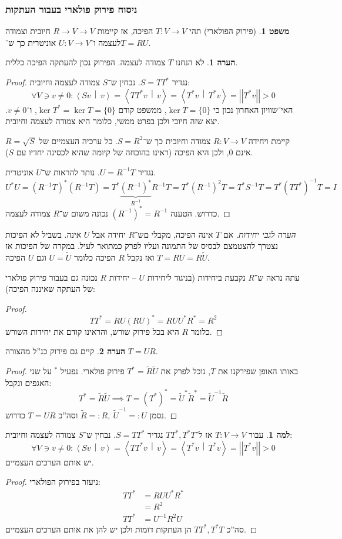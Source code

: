 \documentclass[a4paper]{article}
\newcommand\ra    {\rangle}
\newcommand\la    {\langle}
\newcommand\co        {\colon}
\newcommand\norm[1]   {\left \vert \left \vert #1 \right \vert \right \vert}
\newcommand\mut [2]   {\left \la #1 \,\middle\vert\, #2 \right \ra}
\newcommand\tl    {\tilde}
\newcommand\op    {^{-1}}
\theoremstyle{definition}
\newtheorem{Theorem}{משפט}
\newtheorem{Lemma}{למה}
\newtheorem{Remark}{הערה}
\newcommand\theo  [1] {\begin{Theorem}#1\end{Theorem}}
\newcommand\rmark [1] {\begin{Remark}#1\end{Remark}}
\newcommand\lem   [1] {\begin{Lemma}#1\end{Lemma}}
\begin{document}
	\subsubsection{ניסוח פירוק פולארי בעבור העתקות}
	\theo{(פירוק הפולארי) תהי $T \co V \to V$ הפיכה, אז קיימות $R \to V \to V$ חיובית וצמודה לעצמה ו־$U \co V \to V$ אוניטרית כך ש־$T = RU$. }
	\rmark{לא הנחנו $T$ צמודה לעצמה. הפירוק נכון להעתקה הפיכה כללית. }
	\begin{proof}
		נגדיר $S = TT^*$. נבחין ש־$S$ צמודה לעצמה וחיובית: 
		\[ \forall V \ni v \neq 0 \co \mut{Sv}{v} = \mut{TT^* v}{v} = \mut{T^* v}{T^*v} = \norm{T^*v} > 0 \]
		האי־שוויון האחרון נכון כי $\ker T = \{0\}$, ממשפט קודם $\ker T^* = \ker T = \{0\}$, ו־$v \neq 0$. יצא שזה חיובי ולכן בפרט ממשי, כלומר היא צמודה לעצמה וחיובית. 
		
		קיימת ויחידה $R \co V \to V$ צמודה וחיובית כך ש־$S = R^2$. כל ערכיה העצמיים של $R = \sqrt S$ אינם $0$, ולכן היא הפיכה (ראינו בהוכחה של קיומה שהיא לכסינה יחדיו עם $S$). 
		
		נגדיר $U = R\op T$. נותר להראות ש־$U$ אוניטרית. 
		\[ U^*U = (R\op T)^*(R\op T) = T^*\underbrace{(R\op)^*}_{R\op}R\op T = T^*(R\op)^2 T = T^*S\op T = T^*(TT^*)\op T = I \]
		כדרוש. הטענה $(R\op)^* = R\op$ נכונה משום ש־$R$ צמודה לעצמה. 
	\end{proof}
	
	\textit{הערה לגבי יחידות. }אם $T$ אינה הפיכה, מקבלי םש־$R$ יחידה אבל $U$ אינה. בשביל לא הפיכות נצטרך להצטמצם לבסיס של התמונה ועליו לפרק כמתואר לעיל. במקרה של הפיכות אז $T = RU = R \tl U$ ואז נקבל $R$ הפיכה כלומר $U = \tl U$ וגם $U$ הפיכה. 
	
	עתה נראה ש־$R$ נקבעת ביחידות (בניגוד ליחידות $U$ – יחידות $R$ נכונה גם בעבור פירוק פולארי של העתקה שאיננה הפיכה): 
	\begin{proof}
		\[ TT^* = RU(RU)^* = RUU^*R^* = R^2 \]
		כלומר $R$ היא בכל פירוק שורש, והראינו קודם את יחידות השורש. 
	\end{proof}
	\rmark{קיים גם פירוק כנ''ל מהצורה $T = UR$. }
	\begin{proof}
		באותו האופן שפירקנו את $T$, נוכל לפרק את $T^* = \tl R \tl U$ פירוק פולארי. נפעיל $^*$ על שני האגפים ונקבל: 
		\[ T^* =\tl R \tl U \implies T = (T^*)^* = \tl U^*\tl R^* = \tl U\op \tl R \]
		נסמן $\tl R =: R, \ \tl U\op =: U$ וסה''כ $T = UR$ כדרוש. 
	\end{proof}
	\lem{עבור $T \co V \to V$ אז ל־$TT^*, T^*T$
		נגדיר $S = TT^*$. נבחין ש־$S$ צמודה לעצמה וחיובית: 
		\[ \forall V \ni v \neq 0 \co \mut{Sv}{v} = \mut{TT^* v}{v} = \mut{T^* v}{T^*v} = \norm{T^*v} > 0 \] יש אותם הערכים העצמיים. }
	\begin{proof}ניעזר בפירוק הפולארי: 
		\begin{align*}
			TT^* &= RUU^*R^* \\
			&= R^2 \\
			TT^* &= U\op R^2U
		\end{align*}
		סה''כ $TT^*, T^*T$ הן העתקות דומות ולכן יש להן את אותם הערכים העצמיים. 
	\end{proof}
	
\end{document}
